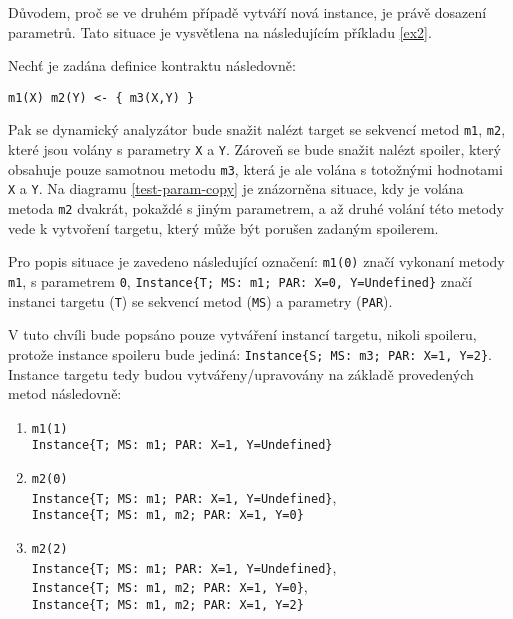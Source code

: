 Důvodem, proč se ve druhém případě vytváří nová instance, je právě dosazení parametrů. Tato situace je vysvětlena na následujícím příkladu \ref{ex2}.

\begin{exmp}\label{ex2}
Nechť je zadána definice kontraktu následovně:

\begin{lstlisting}
m1(X) m2(Y) <- { m3(X,Y) }
\end{lstlisting}

Pak se dynamický analyzátor bude snažit nalézt target se sekvencí metod \texttt{m1}, \texttt{m2}, které jsou volány s parametry \texttt{X} a \texttt{Y}. Zároveň se bude snažit nalézt spoiler, který obsahuje pouze samotnou metodu \texttt{m3}, která je ale volána s totožnými hodnotami \texttt{X} a \texttt{Y}. Na diagramu \ref{test-param-copy} je znázorněna situace, kdy je volána metoda \texttt{m2} dvakrát, pokaždé s jiným parametrem, a až druhé volání této metody vede k vytvoření targetu, který může být porušen zadaným spoilerem.

Pro popis situace je zavedeno následující označení: \texttt{m1(0)} značí vykonaní metody \texttt{m1}, s parametrem \texttt{0}, \texttt{Instance\{T; MS: m1; PAR: X=0, Y=Undefined\}} značí instanci targetu (\texttt{T}) se sekvencí metod (\texttt{MS}) a parametry (\texttt{PAR}).

V tuto chvíli bude popsáno pouze vytváření instancí targetu, nikoli spoileru, protože instance spoileru bude jediná: \texttt{Instance\{S; MS: m3; PAR: X=1, Y=2\}}. Instance targetu tedy budou vytvářeny/upravovány na základě provedených metod následovně:

\begin{enumerate}
\item \texttt{m1(1)}\\
\texttt{Instance\{T; MS: m1; PAR: X=1, Y=Undefined\}}

\item \texttt{m2(0)}\\
\texttt{Instance\{T; MS: m1; PAR: X=1, Y=Undefined\}},\\
\texttt{Instance\{T; MS: m1, m2; PAR: X=1, Y=0\}}

\item \texttt{m2(2)}\\
\texttt{Instance\{T; MS: m1; PAR: X=1, Y=Undefined\}},\\
\texttt{Instance\{T; MS: m1, m2; PAR: X=1, Y=0\}},\\
\texttt{Instance\{T; MS: m1, m2; PAR: X=1, Y=2\}}


\end{enumerate}
\end{exmp}
